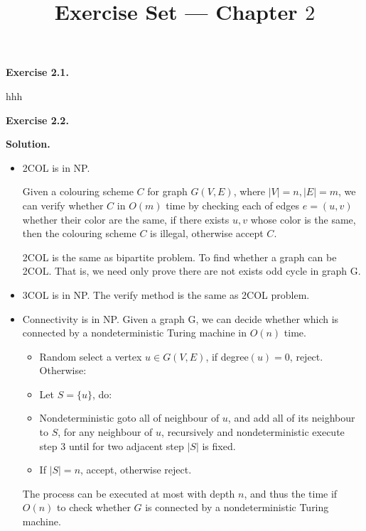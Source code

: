 \documentclass[a4paper]{article}
\title{Exercise Set --- Chapter $2$}
\date{}
\newenvironment{exercise}[1]{
	\par
	\noindent\textbf{Exercise #1.}\quad
}{
	\par
	\bigskip
}
\begin{document}
\maketitle

	\begin{exercise}{2.1}
	    hhh
	\end{exercise}

	\begin{exercise}{2.2}
		\textbf{Solution.}
		\begin{itemize}
			\item 2COL is in NP.

			Given a colouring scheme $C$ for graph $G(V,E)$, where $|V| = n, |E| = m$, we can verify whether $C$ in $O(m)$ time by checking each of edges $e = (u,v)$ whether their color are the same, if there exists $u,v$ whose color is the same, then the colouring scheme $C$ is illegal, otherwise accept $C$.

			2COL is the same as bipartite problem. To find whether a graph can be 2COL. That is, we need only prove there are not exists odd cycle in graph G.
			\item 3COL is in NP. The verify method is the same as 2COL problem.
			\item Connectivity is in NP. 
			Given a graph G, we can decide whether which is connected by a nondeterministic Turing machine in $O(n)$ time.
			\begin{itemize}
				\item Random select a vertex $u\in G(V,E)$, if degree$(u) = 0$, reject. Otherwise:
				\item Let $S = \{u\}$, do:
				\item \quad Nondeterministic goto all of neighbour of $u$, and add all of its neighbour to $S$, for any neighbour of $u$, recursively and nondeterministic execute step 3 until for two adjacent step $|S|$ is fixed. 
				\item If $|S| = n$, accept, otherwise reject. 
			\end{itemize}
			The process can be executed at most with depth $n$, and thus the time if $O(n)$ to check whether $G$ is connected by a nondeterministic Turing machine.
		\end{itemize}


\end{exercise}
\end{document}
